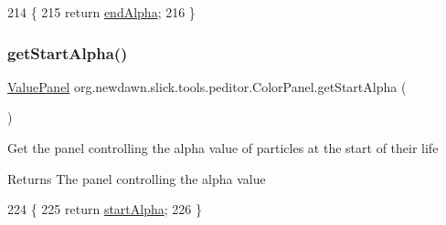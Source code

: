 \begin{DoxyCode}
214                                     \{
215         \textcolor{keywordflow}{return} \mbox{\hyperlink{classorg_1_1newdawn_1_1slick_1_1tools_1_1peditor_1_1_color_panel_a0173ddb61e259abd353f5d8a17f75af2}{endAlpha}};
216     \}
\end{DoxyCode}
\mbox{\label{classorg_1_1newdawn_1_1slick_1_1tools_1_1peditor_1_1_color_panel_a00811a42b2046f100e075de7313cfb8b}} 
\subsubsection{\texorpdfstring{get\+Start\+Alpha()}{getStartAlpha()}}
{\footnotesize\ttfamily \mbox{\hyperlink{classorg_1_1newdawn_1_1slick_1_1tools_1_1peditor_1_1_value_panel}{Value\+Panel}} org.\+newdawn.\+slick.\+tools.\+peditor.\+Color\+Panel.\+get\+Start\+Alpha (\begin{DoxyParamCaption}{ }\end{DoxyParamCaption})\hspace{0.3cm}{\ttfamily [inline]}}

Get the panel controlling the alpha value of particles at the start of their life

\begin{DoxyReturn}{Returns}
The panel controlling the alpha value 
\end{DoxyReturn}

\begin{DoxyCode}
224                                       \{
225         \textcolor{keywordflow}{return} \mbox{\hyperlink{classorg_1_1newdawn_1_1slick_1_1tools_1_1peditor_1_1_color_panel_afe8553cf4ac1da0b98e8d212cc5081da}{startAlpha}};
226     \}
\end{DoxyCode}
\mbox{\label{classorg_1_1newdawn_1_1slick_1_1tools_1_1peditor_1_1_color_panel_a6f2468161ab61b6d6387dfe9b893cd4c}} 
